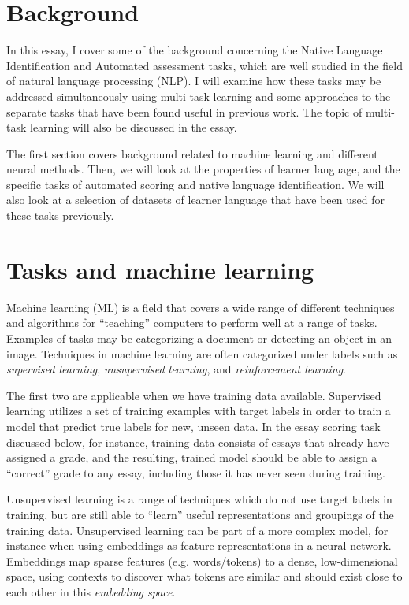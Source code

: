 \section{Background}

In this essay, I cover some of the background concerning the Native Language
Identification and Automated assessment tasks, which are well studied in the
field of natural language processing (NLP). I will examine how these tasks
may be addressed simultaneously using multi-task learning and some approaches
to the separate tasks that have been found useful in previous work. The topic
of multi-task learning will also be discussed in the essay.

The first section covers background related to machine learning and different
neural methods. Then, we will look at the properties of learner language, and
the specific tasks of automated scoring and native language identification.
We will also look at a selection of datasets of learner language that have
been used for these tasks previously.


\section{Tasks and machine learning}

Machine learning (ML) is a field that covers a wide range of different
techniques and algorithms for ``teaching'' computers to perform well at a
range of tasks. Examples of tasks may be categorizing a document or detecting
an object in an image. Techniques in machine learning are often categorized
under labels such as \emph{supervised learning}, \emph{unsupervised
learning}, and \emph{reinforcement learning}.

The first two are applicable when we have training data available. Supervised
learning utilizes a set of training examples with target labels in order to
train a model that predict true labels for new, unseen data. In the essay
scoring task discussed below, for instance, training data consists of essays
that already have assigned a grade, and the resulting, trained model should
be able to assign a ``correct'' grade to any essay, including those it has
never seen during training.

Unsupervised learning is a range of techniques which do not use target labels
in training, but are still able to ``learn'' useful representations and
groupings of the training data. Unsupervised learning can be part of a more
complex model, for instance when using embeddings as feature representations
in a neural network. Embeddings map sparse features (e.g. words/tokens) to a
dense, low-dimensional space, using contexts to discover what tokens are
similar and should exist close to each other in this \emph{embedding space}.

